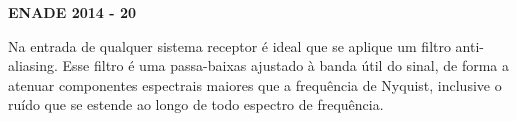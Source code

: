 \textbf{ENADE 2014 - 20}

Na entrada de qualquer sistema receptor é ideal que se aplique um filtro anti-aliasing. Esse filtro é uma passa-baixas ajustado à banda útil do sinal, de forma a atenuar componentes espectrais maiores que a frequência de Nyquist, inclusive o ruído que se estende ao longo de todo espectro de frequência.